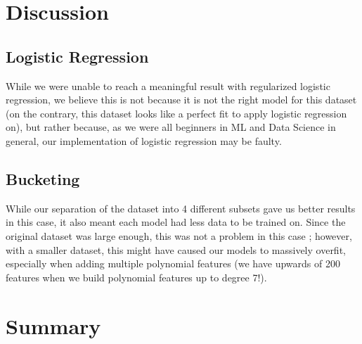 \documentclass[10pt,conference,compsocconf]{IEEEtran}
\begin{document}
\section{Discussion}
\subsection{Logistic Regression}
While we were unable to reach a meaningful result with regularized logistic regression, we believe this is not because it is not the right model for this dataset (on the contrary, this dataset looks like a perfect fit to apply logistic regression on), but rather because, as we were all beginners in ML and Data Science in general, our implementation of logistic regression may be faulty.

\subsection{Bucketing}
While our separation of the dataset into 4 different subsets gave us better results in this case, it also meant each model had less data to be trained on. Since the original dataset was large enough, this was not a problem in this case ; however, with a smaller dataset, this might have caused our models to massively overfit, especially when adding multiple polynomial features (we have upwards of 200 features when we build polynomial features up to degree 7!).

\section{Summary}
\end{document}
